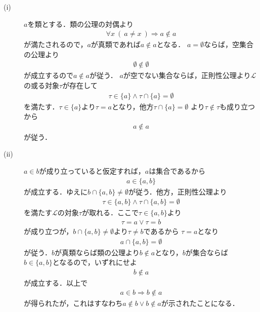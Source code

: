 	\begin{prf}\mbox{}
		\begin{description}
			\item[(i)] $a$を類とする．類の公理の対偶より
				\begin{align}
					\forall x\ (\ a \neq x\ ) \Longrightarrow a \notin a
				\end{align}
				が満たされるので，$a$が真類であれば$a \notin a$となる．
				$a = \emptyset$ならば，空集合の公理より
				\begin{align}
					\emptyset \notin \emptyset
				\end{align}
				が成立するので$a \notin a$が従う．
				$a$が空でない集合ならば，正則性公理より$\mathcal{L}$の或る対象$\tau$が存在して
				\begin{align}
					\tau \in \{a\} \wedge \tau \cap \{a\} = \emptyset
				\end{align}
				を満たす．$\tau \in \{a\}$より$\tau = a$となり，他方$\tau \cap \{a\} = \emptyset$
				より$\tau \notin \tau$も成り立つから
				\begin{align}
					a \notin a
				\end{align}
				が従う．
			
			\item[(ii)]
				$a \in b$が成り立っていると仮定すれば，$a$は集合であるから
				\begin{align}
					a \in \{a,b\}
				\end{align}
				が成立する．ゆえに$b \cap \{a,b\} \neq \emptyset$が従う．他方，正則性公理より
				\begin{align}
					\tau \in \{a,b\} \wedge \tau \cap \{a,b\} = \emptyset
				\end{align}
				を満たす$\mathcal{L}$の対象$\tau$が取れる．ここで$\tau \in \{a,b\}$より
				\begin{align}
					\tau=a \vee \tau=b
				\end{align}
				が成り立つが，$b \cap \{a,b\} \neq \emptyset$より$\tau \neq b$であるから
				$\tau = a$となり
				\begin{align}
					a \cap \{a,b\} = \emptyset
				\end{align}
				が従う．$b$が真類ならば類の公理より$b \notin a$となり，$b$が集合ならば
				$b \in \{a,b\}$となるので，いずれにせよ
				\begin{align}
					b \notin a
				\end{align}
				が成立する．以上で
				\begin{align}
					a \in b \Longrightarrow b \notin a
				\end{align}
				が得られたが，これはすなわち$a \notin b \vee b \notin a$が示されたことになる．
				

\end{description}
\end{prf}
